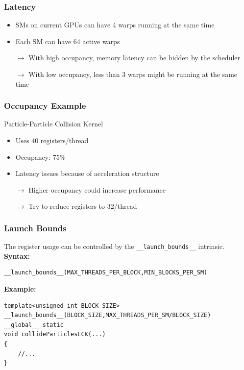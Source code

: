 \documentclass[aspectratio=169,handout]{beamer}
\begin{document}
\begin{frame}[fragile]
\frametitle{Latency}

\begin{itemize}
	\item SMs on current GPUs can have 4 warps running at the same time
	\item Each SM can have 64 active warps
	\item[$\rightarrow$] With high occupancy, memory latency can be hidden by the scheduler
	\item[$\rightarrow$] With low occupancy, less than 3 warps might be running at the same time
\end{itemize}
\end{frame}



\begin{frame}[fragile]
\frametitle{Occupancy Example}

\begin{minipage}{0.5\linewidth}
	Particle-Particle Collision Kernel
	\begin{itemize}
		\item Uses 40 registers/thread
		\item Occupancy: 75\%
		\item Latency issues because of acceleration structure
		\item[$\rightarrow$] Higher occupancy could increase performance
		\item[$\rightarrow$] Try to reduce registers to 32/thread
	\end{itemize}
\end{minipage}
\begin{minipage}{0.47\linewidth}

\end{minipage}
\end{frame}


\begin{frame}[fragile]
\frametitle{Launch Bounds}
	The register usage can be controlled by the \texttt{\_\_launch\_bounds\_\_} intrinsic. \\
	\textbf{Syntax:}
\begin{lstlisting}
__launch_bounds__(MAX_THREADS_PER_BLOCK,MIN_BLOCKS_PER_SM)
\end{lstlisting}
\textbf{Example:}
\begin{lstlisting}
template<unsigned int BLOCK_SIZE>
__launch_bounds__(BLOCK_SIZE,MAX_THREADS_PER_SM/BLOCK_SIZE)
__global__ static
void collideParticlesLCK(...)
{
 	//...
}
\end{lstlisting}

\end{frame}
\end{document}
